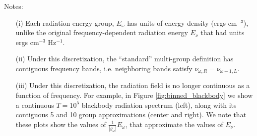 \documentclass[10pt]{article}
\renewcommand{\(}{\left(}
\renewcommand{\)}{\right)}
\newcommand{\Enu}{E_{\nu}}
\begin{document}
Notes:
\begin{itemize}
\item[(i)] Each radiation energy group, $E_{\omega}$ has units of
  energy density (ergs cm$^{-3}$), unlike the original
  frequency-dependent radiation energy $\Enu$ that had units ergs cm$^{-3}$
  Hz$^{-1}$.

\item[(ii)] Under this discretization, the ``standard'' multi-group
  definition has contiguous frequency bands, i.e. neighboring bands
  satisfy $\nu_{\omega,R} = \nu_{\omega+1,L}$.

\item[(iii)] Under this discretization, the radiation field is no longer
  continuous as a function of frequency.  For example, in Figure
  \ref{fig:binned_blackbody} we show a continuous $T=10^5$
  blackbody radiation spectrum (left), along with its contiguous 5 and
  10 group approximations (center and right).  We note that these
  plots show the values of $\frac{1}{|g_{\omega}|}E_{\omega}$, that
  approximate the values of $\Enu$.


\end{itemize}
\end{document}
